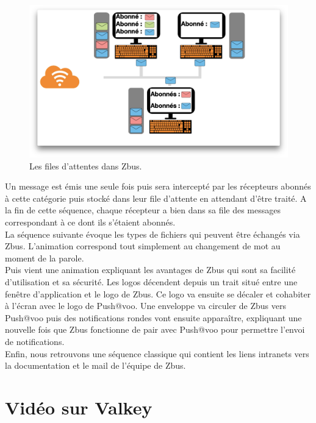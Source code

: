 \begin{figure}[htp]
  \centering
  \includegraphics[width=15cm]{images/zbus/screensbus.png}
  \caption{Les files d'attentes dans Zbus.}
  \label{screenzbus}
\end{figure}


Un message est émis une seule fois puis sera intercepté par les récepteurs abonnés à cette catégorie puis stocké dans leur file d'attente en attendant d'être traité. A la fin de cette séquence, chaque récepteur a bien dans sa file des messages correspondant à ce dont ils s'étaient abonnés.\\

La séquence suivante évoque les types de fichiers qui peuvent être échangés via Zbus. L'animation correspond tout simplement au changement de mot au moment de la parole.\\

Puis vient une animation expliquant les avantages de Zbus qui sont sa facilité d'utilisation et sa sécurité. Les logos décendent depuis un trait situé entre une fenêtre d'application et le logo de Zbus. Ce logo va ensuite se décaler et cohabiter à l'écran avec le logo de Push@voo. Une enveloppe va circuler de Zbus vers Push@voo puis des notifications rondes vont ensuite apparaître, expliquant une nouvelle fois que Zbus fonctionne de pair avec Push@voo pour permettre l'envoi de notifications.\\

Enfin, nous retrouvons une séquence classique qui contient les liens intranets vers la documentation et le mail de l'équipe de Zbus.


\section{Vidéo sur Valkey}

